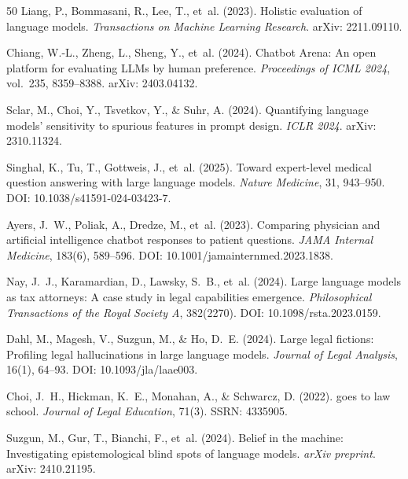 \documentclass[11pt,a4paper]{article}
\begin{document}
\begin{thebibliography}{50}
Liang, P., Bommasani, R., Lee, T., et~al. (2023).
\newblock Holistic evaluation of language models.
\newblock \emph{Transactions on Machine Learning Research}.
\newblock arXiv: 2211.09110.

Chiang, W.-L., Zheng, L., Sheng, Y., et~al. (2024).
\newblock Chatbot {Arena}: An open platform for evaluating {LLMs} by human preference.
\newblock \emph{Proceedings of ICML 2024}, vol.~235, 8359--8388.
\newblock arXiv: 2403.04132.

Sclar, M., Choi, Y., Tsvetkov, Y., \& Suhr, A. (2024).
\newblock Quantifying language models' sensitivity to spurious features in prompt design.
\newblock \emph{ICLR 2024}.
\newblock arXiv: 2310.11324.

Singhal, K., Tu, T., Gottweis, J., et~al. (2025).
\newblock Toward expert-level medical question answering with large language models.
\newblock \emph{Nature Medicine}, 31, 943--950.
\newblock DOI: 10.1038/s41591-024-03423-7.

Ayers, J.~W., Poliak, A., Dredze, M., et~al. (2023).
\newblock Comparing physician and artificial intelligence chatbot responses to patient questions.
\newblock \emph{JAMA Internal Medicine}, 183(6), 589--596.
\newblock DOI: 10.1001/jamainternmed.2023.1838.

Nay, J.~J., Karamardian, D., Lawsky, S.~B., et~al. (2024).
\newblock Large language models as tax attorneys: A case study in legal capabilities emergence.
\newblock \emph{Philosophical Transactions of the Royal Society A}, 382(2270).
\newblock DOI: 10.1098/rsta.2023.0159.

Dahl, M., Magesh, V., Suzgun, M., \& Ho, D.~E. (2024).
\newblock Large legal fictions: Profiling legal hallucinations in large language models.
\newblock \emph{Journal of Legal Analysis}, 16(1), 64--93.
\newblock DOI: 10.1093/jla/laae003.

Choi, J.~H., Hickman, K.~E., Monahan, A., \& Schwarcz, D. (2022).
 goes to law school.
\newblock \emph{Journal of Legal Education}, 71(3).
\newblock SSRN: 4335905.

Suzgun, M., Gur, T., Bianchi, F., et~al. (2024).
\newblock Belief in the machine: Investigating epistemological blind spots of language models.
\newblock \emph{arXiv preprint}.
\newblock arXiv: 2410.21195.


\end{thebibliography}
\end{document}
